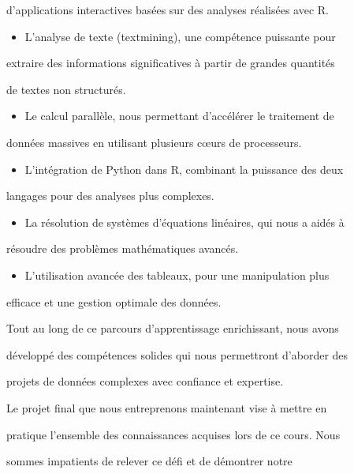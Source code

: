 \documentclass[
  14pt,
]{article}
\providecommand{\tightlist}{%
  \setlength{\itemsep}{0pt}\setlength{\parskip}{0pt}}
\begin{document}
d'applications interactives basées sur des analyses réalisées avec R.

\begin{itemize}
\tightlist
\item
  L'analyse de texte (textmining), une compétence puissante pour
\end{itemize}

extraire des informations significatives à partir de grandes quantités

de textes non structurés.

\begin{itemize}
\tightlist
\item
  Le calcul parallèle, nous permettant d'accélérer le traitement de
\end{itemize}

données massives en utilisant plusieurs cœurs de processeurs.

\begin{itemize}
\tightlist
\item
  L'intégration de Python dans R, combinant la puissance des deux
\end{itemize}

langages pour des analyses plus complexes.

\begin{itemize}
\tightlist
\item
  La résolution de systèmes d'équations linéaires, qui nous a aidés à
\end{itemize}

résoudre des problèmes mathématiques avancés.

\begin{itemize}
\tightlist
\item
  L'utilisation avancée des tableaux, pour une manipulation plus
\end{itemize}

efficace et une gestion optimale des données.

Tout au long de ce parcours d'apprentissage enrichissant, nous avons

développé des compétences solides qui nous permettront d'aborder des

projets de données complexes avec confiance et expertise.

Le projet final que nous entreprenons maintenant vise à mettre en

pratique l'ensemble des connaissances acquises lors de ce cours. Nous

sommes impatients de relever ce défi et de démontrer notre
\end{document}
